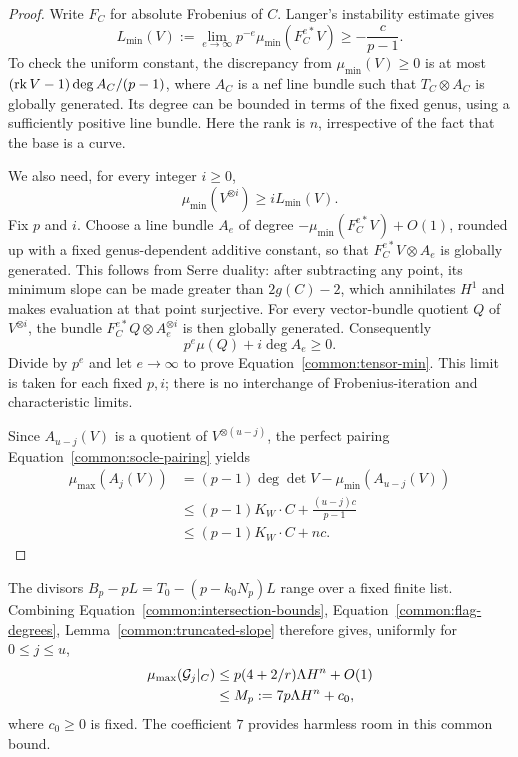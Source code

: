\begin{proof}
Write $F_C$ for absolute Frobenius of $C$.  Langer's instability
estimate \cite[Corollary~2.5]{Langer2004} gives
\begin{equation}\label{common:Langer-min}
 L_{\min}(V):=
 \lim_{e\to\infty}p^{-e}\mu_{\min}(F_C^{e*}V)
 \ge-\frac{c}{p-1}.
\end{equation}
To check the uniform constant, the discrepancy from
$\mu_{\min}(V)\ge0$ is at most
$(\operatorname{rk} V-1)\deg A_C/(p-1)$, where $A_C$ is a nef line bundle such
that $T_C\otimes A_C$ is globally generated.  Its degree can be
bounded in terms of the fixed genus, using a sufficiently positive
line bundle.  Here the rank is $n$, irrespective of the fact that the base
is a curve.

We also need, for every integer $i\ge0$,
\begin{equation}\label{common:tensor-min}
 \mu_{\min}(V^{\otimes i})\ge iL_{\min}(V).
\end{equation}
Fix $p$ and $i$.  Choose a line bundle $A_e$ of degree
$-\mu_{\min}(F_C^{e*}V)+O(1)$, rounded up with a fixed
genus-dependent additive constant, so that
$F_C^{e*}V\otimes A_e$ is globally generated.  This follows from
Serre duality: after subtracting any point, its minimum slope can
be made greater than $2g(C)-2$, which annihilates $H^1$ and makes
evaluation at that point surjective.  For every vector-bundle
quotient $Q$ of $V^{\otimes i}$, the bundle
$F_C^{e*}Q\otimes A_e^{\otimes i}$ is then globally generated.
Consequently
\[
 p^e\mu(Q)+i\deg A_e\ge0.
\]
Divide by $p^e$ and let $e\to\infty$ to prove
Equation~\eqref{common:tensor-min}.  This limit is taken for each fixed $p,i$;
there is no interchange of Frobenius-iteration and characteristic
limits.

Since $A_{u-j}(V)$ is a quotient of $V^{\otimes(u-j)}$, the perfect
pairing Equation~\eqref{common:socle-pairing} yields
\begin{align*}
 \mu_{\max}(A_j(V))
 &= (p-1)\deg\det V-\mu_{\min}(A_{u-j}(V))\\
 &\le(p-1)K_W\cdot C+\frac{(u-j)c}{p-1}\\
 &\le(p-1)K_W\cdot C+nc.
\end{align*}
\end{proof}

The divisors $B_p-pL=T_0-(p-k_0N_p)L$ range over a fixed finite
list.  Combining Equation~\eqref{common:intersection-bounds}, Equation~\eqref{common:flag-degrees}, Lemma~\ref{common:truncated-slope}
therefore gives, uniformly for $0\le j\le u$,
\begin{align}
 \mu_{\max}(\mathcal G_j|_C)
 &\le p(4+2/r)\Lambda H^n+O(1)\notag\\
 &\le M_p:=7p\Lambda H^n+c_0,\label{common:common-slope-bound}
\end{align}
where $c_0\ge0$ is fixed.  The coefficient $7$ provides harmless
room in this common bound.

